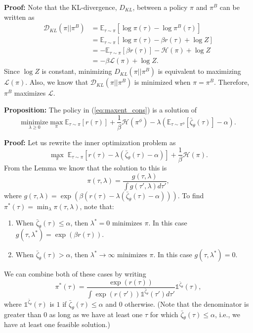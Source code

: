\textbf{Proof:} Note that the KL-divergence, $D_{KL}$, between a policy $\pi$ and $\pi^B$ can be written as
\begin{equation}
    \begin{split}
    \mathcal{D}_{KL}(\pi\vert\vert\pi^B)
    &= \mathbb{E}_{\tau\sim\pi}[\log\pi(\tau)-\log\pi^B(\tau)]\\
    &= \mathbb{E}_{\tau\sim\pi}[\log\pi(\tau)-\beta r(\tau)+\log Z]\\
    &=-\mathbb{E}_{\tau\sim\pi}[\beta r(\tau)]-\mathcal{H}(\pi) + \log Z\\
    &=-\beta\mathcal{L}(\pi) + \log Z.
    \end{split}
\end{equation}
Since $\log Z$ is constant, minimizing $D_{KL}(\pi\vert\vert\pi^B)$ is equivalent to maximizing $\mathcal{L}(\pi)$. Also, we know that $\mathcal{D}_{KL}(\pi\vert\vert\pi^B)$ is minimized when $\pi = \pi^B$. Therefore, $\pi^B$ maximizes $\mathcal{L}$.

\textbf{Proposition:} The policy in (\ref{eq:maxent_cons}) is a solution of
\begin{equation}
	\underset{\lambda \geq 0}{\text{minimize}} \max_\pi \mathbb{E}_{\tau\sim\pi}[r(\tau)] +\frac{1}{\beta}\mathcal{H}(\pi^{\phi}) - \lambda (\mathbb{E}_{\tau\sim\pi^{\phi}}[\bar{\zeta}_\theta(\tau)] - \alpha).
\end{equation}

\textbf{Proof:} Let us rewrite the inner optimization problem as
\begin{equation}
    \max_\pi\; \mathbb{E}_{\tau\sim\pi}[r(\tau)-\lambda (\bar{\zeta}_\theta(\tau)-\alpha)] + \frac{1}{\beta}\mathcal{H}(\pi).
\end{equation}
From the Lemma we know that the solution to this is
\begin{equation}
    \pi(\tau,\lambda) = \frac{g(\tau,\lambda)}{\int g(\tau',\lambda) d\tau'},
\end{equation}
where $g(\tau,\lambda)=\exp(\beta (r(\tau)-\lambda (\bar{\zeta}_\theta(\tau)-\alpha)))$. To find $\pi^*(\tau) = \min_\lambda \pi(\tau,\lambda)$, note that:
\begin{enumerate}
    \item When $\bar{\zeta}_\theta(\tau) \leq \alpha$, then $\lambda^* = 0$ minimizes $\pi$. In this case $g(\tau,\lambda^*) = \exp(\beta r(\tau))$.
    \item When $\bar{\zeta}_\theta(\tau)>\alpha$, then $\lambda^* \rightarrow \infty$ minimizes $\pi$. In this case $g(\tau,\lambda^*)=0$.
\end{enumerate}
We can combine both of these cases by writing
\begin{equation}
    \pi^*(\tau) = \frac{\exp(r(\tau))}{\int \exp(r(\tau'))\mathds{1}^{\bar{\zeta}_\theta}(\tau')d\tau'}\mathds{1}^{\bar{\zeta}_\theta}(\tau),
\end{equation}
where $\mathds{1}^{\bar{\zeta}_\theta}(\tau)$ is $1$ if $\bar{\zeta}_\theta(\tau) \leq \alpha$ and $0$ otherwise. (Note that the denominator is greater than $0$ as long as we have at least one $\tau$ for which $\bar{\zeta}_\theta(\tau) \leq \alpha$, i.e., we have at least one feasible solution.)

